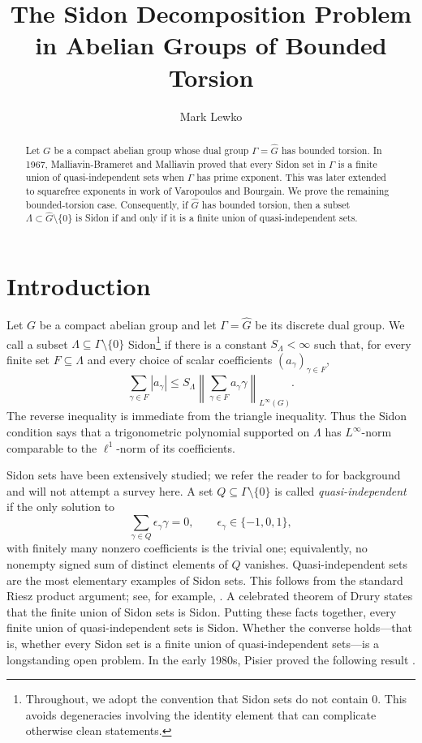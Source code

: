 \documentclass[11pt]{amsart}
\title{The Sidon Decomposition Problem in Abelian Groups of Bounded Torsion}
\author{Mark Lewko}
\date{}
\begin{document}
\begin{abstract}
Let \(G\) be a compact abelian group whose dual group \(\Gamma=\widehat{G}\) has bounded torsion. In 1967, Malliavin-Brameret and Malliavin proved that every Sidon set in \(\Gamma\) is a finite union of quasi-independent sets when \(\Gamma\) has prime exponent. This was later extended to squarefree exponents in work of Varopoulos and Bourgain. We prove the remaining bounded-torsion case. Consequently, if \(\widehat{G}\) has bounded torsion, then a subset \(\Lambda\subset \widehat{G}\setminus\{0\}\) is Sidon if and only if it is a finite union of quasi-independent sets.
\end{abstract}


\maketitle

\section{Introduction}\label{sec:intro}
Let \(G\) be a compact abelian group and let \(\Gamma=\widehat G\) be its discrete dual group. We call a subset \(\Lambda\subseteq \Gamma\setminus\{0\}\) Sidon\footnote{Throughout, we adopt the convention that Sidon sets do not contain \(0\). This avoids degeneracies involving the identity element that can complicate otherwise clean statements.} if there is a constant \(S_\Lambda<\infty\) such that, for every finite set \(F\subseteq\Lambda\) and every choice of scalar coefficients \((a_\gamma)_{\gamma\in F}\),
$$
        \sum_{\gamma\in F}|a_\gamma|
        \leq
        S_\Lambda\left\|\sum_{\gamma\in F}a_\gamma\gamma\right\|_{L^\infty(G)}.
$$
The reverse inequality is immediate from the triangle inequality. Thus the Sidon condition says that a trigonometric polynomial supported on \(\Lambda\) has \(L^\infty\)-norm comparable to the $\ell^1$-norm of its coefficients.

Sidon sets have been extensively studied; we refer the reader to \cite{GH,LR,Pisier2016Subgaussian} for background and will not attempt a survey here. A set \(Q\subseteq\Gamma\setminus\{0\}\) is called \emph{quasi-independent} if the only solution to
$$
        \sum_{\gamma\in Q}\epsilon_\gamma\gamma=0,
        \qquad \epsilon_\gamma\in\{-1,0,1\},
$$
with finitely many nonzero coefficients is the trivial one; equivalently, no nonempty signed sum of distinct elements of \(Q\) vanishes. Quasi-independent sets are the most elementary examples of Sidon sets. This follows from the standard Riesz product argument; see, for example, \cite{GH,LR}. A celebrated theorem of Drury \cite{Drury} states that the finite union of Sidon sets is Sidon. Putting these facts together, every finite union of quasi-independent sets is Sidon. Whether the converse holds---that is, whether every Sidon set is a finite union of quasi-independent sets---is a longstanding open problem. In the early 1980s, Pisier proved the following result \cite{Pisier1981Sidon,Pisier1983Arithmetic,Pisier1983Entropy}.
\end{document}
